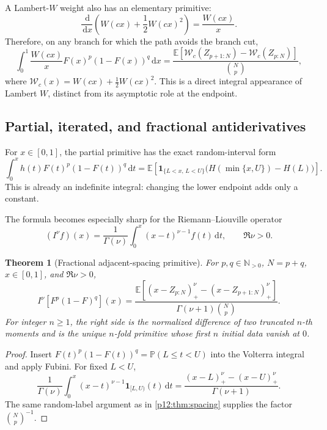 \documentclass[11pt,oneside]{article}
\newtheorem{theorem}{Theorem}[section]
\theoremstyle{definition}
\theoremstyle{remark}
\newcommand{\F}{F}
\newcommand{\E}{\mathbb E}
\newcommand{\Pp}{\mathbb P}
\newcommand{\N}{\mathbb N}
\newcommand{\dd}{\,\mathrm d}
\newcommand{\1}{\mathbf 1}
\begin{document}
A Lambert-\(W\) weight also has an elementary primitive:
\begin{equation}
 \frac{\dd}{\dd x}
 \left(W(cx)+\frac12W(cx)^2\right)=\frac{W(cx)}{x}.
\end{equation}
Therefore, on any branch for which the path avoids the branch cut,
\begin{equation}\label{p12:eq:lambertweight}
 \int_0^1\frac{W(cx)}x\F(x)^p(1-\F(x))^q\dd x
 =\frac{\E[\mathcal W_c(Z_{p+1:N})-\mathcal W_c(Z_{p:N})]}
 {\binom Np},
\end{equation}
where \(\mathcal W_c(x)=W(cx)+\tfrac12W(cx)^2\).  This is a direct integral
appearance of Lambert \(W\), distinct from its asymptotic role at the endpoint.

\subsection{Partial, iterated, and fractional antiderivatives}

For \(x\in[0,1]\), the partial primitive has the exact random-interval form
\begin{equation}\label{p12:eq:partialspacing}
 \int_0^x h(t)\F(t)^p(1-\F(t))^q\dd t
 =\E\!\left[
 \mathbf1_{\{L<x,\,L<U\}}
 \bigl(H(\min\{x,U\})-H(L)\bigr)
 \right].
\end{equation}
This is already an indefinite integral: changing the lower endpoint adds only a
constant.

The formula becomes especially sharp for the Riemann--Liouville operator
\begin{equation}
 (I^\nu f)(x)=\frac1{\Gamma(\nu)}\int_0^x(x-t)^{\nu-1}f(t)\dd t,
 \qquad \Re\nu>0.
\end{equation}

\begin{theorem}[Fractional adjacent-spacing primitive\tagnew]\label{p12:thm:fracspacing}
For \(p,q\in\N_{>0}\), \(N=p+q\), \(x\in[0,1]\), and \(\Re\nu>0\),
\begin{equation}\label{p12:eq:fracspacing}
 \boxed{
 I^\nu\!\left[\F^p(1-\F)^q\right](x)
 =\frac{\E\left[(x-Z_{p:N})_+^\nu-(x-Z_{p+1:N})_+^\nu\right]}
 {\Gamma(\nu+1)\binom Np}.}
\end{equation}
For integer \(n\ge1\), the right side is the normalized difference of two
truncated \(n\)-th moments and is the unique \(n\)-fold primitive whose first
\(n\) initial data vanish at \(0\).
\end{theorem}

\begin{proof}
Insert
\(\F(t)^p(1-\F(t))^q=\Pp(L\le t<U)\) into the Volterra integral and apply
Fubini.  For fixed \(L<U\),
\[
 \frac1{\Gamma(\nu)}\int_0^x(x-t)^{\nu-1}\mathbf1_{[L,U)}(t)\dd t
 =\frac{(x-L)_+^\nu-(x-U)_+^\nu}{\Gamma(\nu+1)}.
\]
The same random-label argument as in \cref{p12:thm:spacing} supplies the factor
\(\binom Np^{-1}\).
\end{proof}
\end{document}
